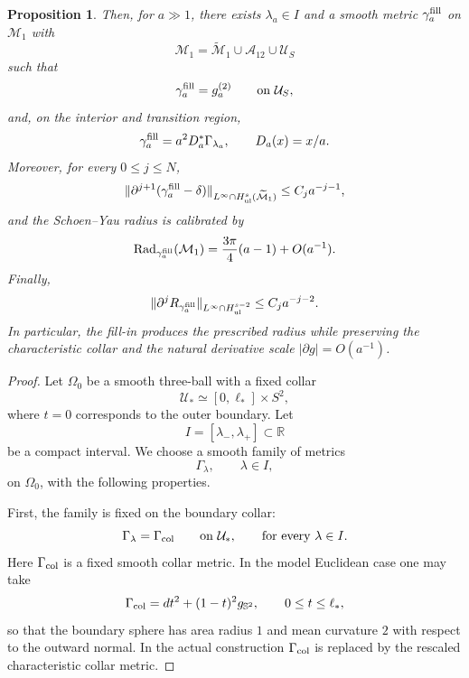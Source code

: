 \documentclass{amsart}
\newtheorem{proposition}{Proposition}[section]
\begin{document}
{\begin{proposition}
\noindent Then, for \(a\gg1\), there exists \(\lambda_a\in I\) and a smooth metric
\(\gamma_a^{\rm fill}\) on \(\mathcal M_1\) with
\[
        \mathcal M_1=\widetilde{\mathcal M}_1\cup\mathcal A_{12}\cup\mathcal U_S
\]
such that
\[
        \gamma_a^{\rm fill}=g_a^{(2)}
        \qquad\text{on }\mathcal U_S,
\]
and, on the interior and transition region,
\[
        \gamma_a^{\rm fill}
        =
        a^2D_a^*\Gamma_{\lambda_a},
        \qquad
        D_a(x)=x/a .
\]
Moreover, for every \(0\le j\le N\),
\[
        \|\partial^{j+1}(\gamma_a^{\rm fill}-\delta)\|_{L^\infty\cap H^s_{\rm ul}(\widetilde{\mathcal{M}}_1)}
        \le C_j a^{-j-1},
\]
and the Schoen--Yau radius is calibrated by
\[
        \operatorname{Rad}_{\gamma_a^{\rm fill}}(\mathcal M_1)
        =
        \frac{3\pi}{4}(a-1)+O(a^{-1}).
\]
Finally,
\[
        \|\partial^jR_{\gamma_a^{\rm fill}}\|_{L^\infty\cap H^{s-2}_{\rm ul}}
        \le C_j a^{-j-2}.
\]
In particular, the fill-in produces the prescribed radius while
preserving the characteristic collar and the natural derivative scale
\(|\partial g|=O(a^{-1})\).
\end{proposition}



\begin{proof}
\noindent Let \(\Omega_0\) be a smooth three-ball with a fixed collar\[
        \mathcal U_*
        \simeq [0,\ell_*]\times S^2,
\]
where \(t=0\) corresponds to the outer boundary. Let
\[
        I=[\lambda_-,\lambda_+]\subset\mathbb R
\]
be a compact interval. We choose a smooth family of metrics
\[
        \Gamma_\lambda,\qquad \lambda\in I,
\]
on \(\Omega_0\), with the following properties.

\noindent First, the family is fixed on the boundary collar:
\begin{equation}
\label{eq:fixed-model-collar}
        \Gamma_\lambda=\Gamma_{\rm col}
        \qquad\text{on }\mathcal U_*,
        \qquad\text{for every }\lambda\in I .
\end{equation}
Here \(\Gamma_{\rm col}\) is a fixed smooth collar metric. In the model
Euclidean case one may take
\[
        \Gamma_{\rm col}
        =
        dt^2+(1-t)^2g_{\mathbb S^2},
        \qquad 0\le t\le \ell_*,
\]
so that the boundary sphere has area radius \(1\) and mean curvature
\(2\) with respect to the outward normal. In the actual construction
\(\Gamma_{\rm col}\) is replaced by the rescaled characteristic collar
metric.


\end{proof}}
\end{document}
